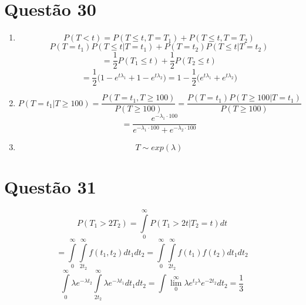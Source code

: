 \documentclass[a4paper,12pt]{report}
\begin{document}
	\section*{Questão 30}
		\begin{enumerate}[label=\alph*)]
				\item $$P(T<t)=P(T\le t ,T=T_1) +P(T\le t ,T=T_2)  $$
				$$P(T=t_1)P(T\le t|T=t_1) + P(T=t_2)P(T\le t|T=t_2)$$
				$$= \frac{1}{2}P(T_1\le t) +\frac{1}{2}P(T_2\le t)   $$
				$$ = \frac{1}{2}\bigg(1-e^{t\lambda_1} +1-e^{t\lambda_2}\bigg)
				 = 1 - \frac{1}{2}\bigg(e^{t\lambda_1} +e^{t\lambda_2}\bigg)
				$$
				
				\item 
				
				$$P(T=t_1|T\ge 100) = \frac{P(T=t_1,T\ge 100)}{P(T\ge 100)}
				= \frac{P(T=t_1)P(T\ge 100|T=t_1)}{P(T\ge 100)} 
				 $$
				 $$
				 = \frac{e^{-\lambda_1 \cdot 100}}{e^{-\lambda_1 \cdot 100}+e^{-\lambda_2 \cdot 100}}
				 $$
				 \item $$T\sim exp(\lambda)$$
					\end{enumerate}
				
					\section*{Questão 31}
					
					$$P(T_1>2T_2) = \int\limits_0^\infty P(T_1>2t|T_2=t)dt $$
					$$= \int\limits_{0}^{\infty}\int\limits_{2t_2}^{\infty}f(t_1,t_2)dt_1 dt_2 = 
					\int\limits_{0}^{\infty}\int\limits_{2t_2}^{\infty}f(t_1)f(t_2)dt_1 dt_2
					 $$
					 $$
					 \int\limits_{0}^{\infty}\lambda e^{-\lambda t_2} \int\limits_{2t_2}^{\infty}\lambda e^{-\lambda t_1} dt_1 dt_2
					 = \int\lim\limits_{0}^\infty \lambda e^{t_2\lambda}e^{-2t_2}dt_2 = \frac{1}{3}
					 $$
														\newpage 
														
\end{document}
